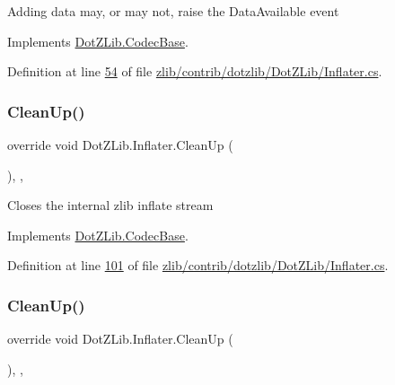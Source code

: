 Adding data may, or may not, raise the {\ttfamily Data\+Available} event

Implements \hyperlink{class_dot_z_lib_1_1_codec_base_ab01e6ad1d9c5b05745dd9e487aaa40ee}{Dot\+Z\+Lib.\+Codec\+Base}.



Definition at line \hyperlink{zlib_2contrib_2dotzlib_2_dot_z_lib_2_inflater_8cs_source_l00054}{54} of file \hyperlink{zlib_2contrib_2dotzlib_2_dot_z_lib_2_inflater_8cs_source}{zlib/contrib/dotzlib/\+Dot\+Z\+Lib/\+Inflater.\+cs}.

\mbox{\label{class_dot_z_lib_1_1_inflater_af4ed4f530151f83222d2cb732a77626b}} 
\subsubsection{\texorpdfstring{Clean\+Up()}{CleanUp()}\hspace{0.1cm}{\footnotesize\ttfamily [1/2]}}
{\footnotesize\ttfamily override void Dot\+Z\+Lib.\+Inflater.\+Clean\+Up (\begin{DoxyParamCaption}{ }\end{DoxyParamCaption})\hspace{0.3cm}{\ttfamily [inline]}, {\ttfamily [protected]}, {\ttfamily [virtual]}}



Closes the internal zlib inflate stream 



Implements \hyperlink{class_dot_z_lib_1_1_codec_base_aa0ded075105c5cf6f5f0d61928c90ca6}{Dot\+Z\+Lib.\+Codec\+Base}.



Definition at line \hyperlink{zlib_2contrib_2dotzlib_2_dot_z_lib_2_inflater_8cs_source_l00101}{101} of file \hyperlink{zlib_2contrib_2dotzlib_2_dot_z_lib_2_inflater_8cs_source}{zlib/contrib/dotzlib/\+Dot\+Z\+Lib/\+Inflater.\+cs}.

\mbox{\label{class_dot_z_lib_1_1_inflater_af4ed4f530151f83222d2cb732a77626b}} 
\subsubsection{\texorpdfstring{Clean\+Up()}{CleanUp()}\hspace{0.1cm}{\footnotesize\ttfamily [2/2]}}
{\footnotesize\ttfamily override void Dot\+Z\+Lib.\+Inflater.\+Clean\+Up (\begin{DoxyParamCaption}{ }\end{DoxyParamCaption})\hspace{0.3cm}{\ttfamily [inline]}, {\ttfamily [protected]}, {\ttfamily [virtual]}}



